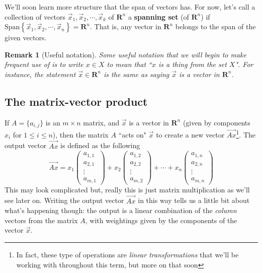 \documentclass[12pt]{article}
\numberwithin{equation}{subsection}
\numberwithin{figure}{subsection}
\theoremstyle{note}
\newtheorem{remark}[subsection]{Remark}
\newcommand\Span[1]{\mathrm{Span}\left\{#1\right\}}
\begin{document}
We'll soon learn more structure that the span of vectors has. For now, let's call a collection of vectors  $\vec{x}_1, \vec{x}_2, \cdots , \vec{x}_k$ of $\mathbf{R}^n$ a \textbf{spanning set} (of $\mathbf{R}^n$) if $\Span{ \vec{x}_1, \vec{x}_2, \cdots , \vec{x}_n}=\mathbf{R}^n$. That is, any vector in $\mathbf{R}^n$ belongs to the span of the given vectors. 

\begin{remark}[Useful notation]
	Some useful notation that we will begin to make frequent use of is to write $x\in X$ to mean that ``$x$ is a thing from the set $X$". For instance, the statement $\vec{x}\in\mathbf{R}^n$ is the same as saying $\vec{x}$ is a vector in $\mathbf{R}^n$. 
\end{remark}



\subsection{The matrix-vector product} 
If $A=\{a_{i,j}\}$ is an $m\times n$ matrix, and $\vec{x}$ is a vector in $\mathbf{R}^n$ (given by components $x_i$ for $1\leq i \leq n$), then the matrix $A$ ``acts on" $\vec{x}$ to create a new vector $\vec{Ax}$\footnote{In fact, these type of operations are \textit{linear transformations} that we'll be working with throughout this term, but more on that soon}. The output vector $\vec{Ax}$ is defined as the following \begin{equation} \vec{Ax}= x_1 \begin{pmatrix} a_{1,1} \\ a_{2,1} \\ \vdots \\ a_{m, 1} \end{pmatrix} + x_2 \begin{pmatrix} a_{1,2} \\ a_{2,2} \\ \vdots \\ a_{m,2} \end{pmatrix} + \cdots + x_n \begin{pmatrix} a_{1,n} \\ a_{2,n} \\ \vdots \\ a_{m,n} \end{pmatrix} \end{equation}
This may look complicated but, really this is just matrix multiplication as we'll see later on. Writing the output vector $\vec{Ax}$ in this way tells us a little bit about what's happening though: the output is a linear combination of the \textit{column} vectors from the matrix $A$, with weightings given by the components of the vector $\vec{x}$. 
\end{document}
